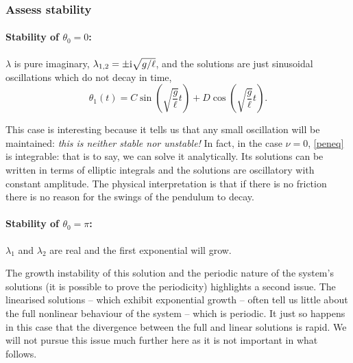 \documentclass[main.tex]{subfiles}
\begin{document}
\subsubsection*{\StepFour Assess stability}
\paragraph{Stability of $\theta_0=0$:} $\lambda$ is pure imaginary, $\lambda_{1,2} = \pm \mathrm{i}\sqrt{g/\ell}$, and the solutions are just sinusoidal oscillations which do not decay in time,
\begin{equation}
\theta_1(t) = C \sin\left(\sqrt{\frac{g}{\ell}} t\right)+ D \cos\left(\sqrt{\frac{g}{\ell}} t \right).
\end{equation}

This case is interesting because it tells us that any small oscillation will be maintained: \emph{this is neither stable nor unstable!} In fact, in the case $\nu=0$, \cref{peneq} is integrable: that is to say, we can solve it analytically. Its solutions can be written in terms of elliptic integrals and the solutions are oscillatory with constant amplitude. The physical interpretation is that if there is no friction there is no reason for the swings of the pendulum to decay. 

\paragraph{Stability of $\theta_0=\pi$:} $\lambda_1$ and $\lambda_2$ are real and the first exponential will grow.

The growth instability of this solution and the periodic nature of the system's solutions (it is possible to prove the periodicity) highlights a second issue. The linearised solutions -- which exhibit exponential growth -- often tell us little about the full nonlinear behaviour of the system -- which is periodic. It just so happens in this case that the divergence between the full and linear solutions is rapid. We will not pursue this issue much further here as it is not important in what follows. 
\end{document}
